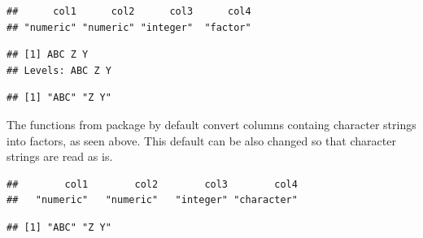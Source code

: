 \documentclass[krantz2]{krantz}\usepackage{knitr}%
\begin{document}
\begin{knitrout}\footnotesize
{}\color{fgcolor}\begin{kframe}
\begin{alltt}
 \hlkwb{<-} \hlstd{(}\hlstd{,}  \hlstd{=} \hlstd{)}
\end{alltt}
\begin{verbatim}
##      col1      col2      col3      col4 
## "numeric" "numeric" "integer"  "factor"
\end{verbatim}
\begin{alltt}
\hlstd{from_csv_e.df[[}\hlstd{]]}
\end{alltt}
\begin{verbatim}
## [1] ABC Z Y
## Levels: ABC Z Y
\end{verbatim}
\begin{alltt}
\hlstd{(from_csv_e.df[[}\hlstd{]])}
\end{alltt}
\begin{verbatim}
## [1] "ABC" "Z Y"
\end{verbatim}
\end{kframe}
\end{knitrout}

The functions from \Rlang {} package by default convert columns containg character strings into factors, as seen above. This default can be also changed so that character strings are read as is.

\begin{knitrout}\footnotesize
{}\color{fgcolor}\begin{kframe}
\begin{alltt}
 \hlkwb{<-} \hlstd{(}\hlstd{,}
                           \hlstd{=} \hlstd{)}
\end{alltt}
\end{kframe}
\end{knitrout}

\begin{knitrout}\footnotesize
{}\color{fgcolor}\begin{kframe}
\begin{alltt}
\end{alltt}
\begin{verbatim}
##        col1        col2        col3        col4 
##   "numeric"   "numeric"   "integer" "character"
\end{verbatim}
\begin{alltt}
\hlstd{from_csv_c.df[[}\hlstd{]]}
\end{alltt}
\begin{verbatim}
## [1] "ABC" "Z Y"
\end{verbatim}
\end{kframe}
\end{knitrout}
\end{document}
